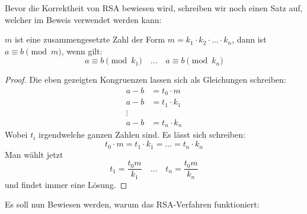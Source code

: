 \noindent
Bevor die Korrektheit von RSA bewiesen wird, schreiben wir noch einen Satz auf, welcher im
Beweis verwendet werden kann:

\begin{satz}
  \label{satz:composite-mod}
  $m$ ist eine zusammengesetzte Zahl der Form $m = k_1 \cdot k_2 \cdot \ldots \cdot k_n$, dann
  ist $a \equiv b \pmod{m}$, wenn gilt:
  \begin{equation*}
    a \equiv b \pmod{k_1} \quad\ldots\quad a \equiv b \pmod{k_n}
  \end{equation*}
\end{satz}
\begin{proof}
  Die eben gezeigten Kongruenzen lassen sich als Gleichungen schreiben:
  \begin{align*}
    a - b & = t_0 \cdot m   \\
    a - b & = t_1 \cdot k_1 \\
    \vdots                  \\
    a - b & = t_n \cdot k_n
  \end{align*}
  Wobei $t_i$ irgendwelche ganzen Zahlen sind. Es lässt sich schreiben:
  \begin{equation*}
    t_0 \cdot m = t_1 \cdot k_1 = \ldots = t_n \cdot k_n
  \end{equation*}
  Man wählt jetzt
  \begin{equation*}
    t_1 = \frac{t_0m}{k_1} \quad\ldots\quad t_n = \frac{t_0m}{k_n}
  \end{equation*}
  und findet immer eine Lösung.
\end{proof}

\noindent
Es soll nun Bewiesen werden, warum das RSA-Verfahren funktioniert:

